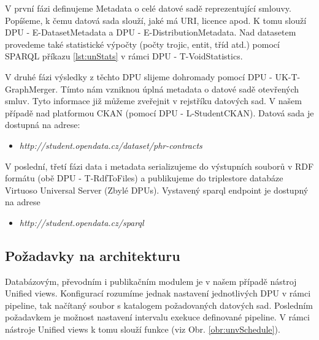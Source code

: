 V první fázi definujeme Metadata o celé datové sadě reprezentující smlouvy. Popíšeme, k čemu datová sada slouží, jaké má URI, licence apod. K tomu slouží DPU - E-DatasetMetadata a DPU - E-DistributionMetadata. Nad datasetem provedeme také statistické výpočty (počty trojic, entit, tříd atd.) pomocí SPARQL příkazu \ref{lst:unStats} v rámci DPU - T-VoidStatistics. 



V druhé fázi výsledky z těchto DPU slijeme dohromady pomocí DPU - UK-T-GraphMerger. Tímto nám vzniknou úplná metadata o datové sadě otevřených smluv. Tyto informace již můžeme zveřejnit v rejstříku datových sad. V našem případě nad platformou CKAN\cite{ckan} (pomocí DPU - L-StudentCKAN). Datová sada je dostupná na adrese:

\begin{itemize}
\item \textit{http://student.opendata.cz/dataset/phr-contracts }\cite{contractCkan}
\end{itemize}

V poslední, třetí fázi data i metadata serializujeme do výstupních souborů v RDF formátu (obě DPU - T-RdfToFiles) a publikujeme do triplestore databáze Virtuoso Universal Server\cite{virtuoso} (Zbylé DPUs). Vystavený sparql endpoint je dostupný na adrese

\begin{itemize}
\item \textit{http://student.opendata.cz/sparql}
\end{itemize}

\subsection{Požadavky na architekturu}

Databázovým, převodním i publikačním modulem je v našem případě nástroj Unified views. Konfigurací rozumíme jednak nastavení jednotlivých DPU v rámci pipeline, tak načítaný soubor s katalogem požadovaných datových sad. Posledním požadavkem je možnost nastavení intervalu exekuce definované pipeline. V rámci nástroje Unified views k tomu slouží funkce  (viz Obr. \ref{obr:unvSchedule}).

